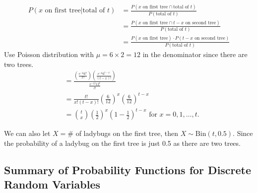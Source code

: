 \begin{example}
\begin{enumerate}[label=(\alph*)]
\begin{align*}
            P(\text{$x$ on first tree} | \text{total of $t$}) &= \frac{P(\text{$x$ on first tree} \cap \text{total of $t$})}{P(\text{total of $t$})} \\
            &= \frac{P(\text{$x$ on first tree} \cap \text{$t-x$ on second tree})}{P(\text{total of $t$})} \\
            &= \frac{P(\text{$x$ on first tree}) \cdot P(\text{$t-x$ on second tree})}{P(\text{total of $t$})}
        \end{align*}
        Use Poisson distribution with $\mu = 6 \times 2 = 12$ in the denominator since there are two trees.
        \begin{align*}
            &= \frac{ \left( \frac{e^{-6} 6^x}{x!} \right) \left( \frac{e^{-6} 6^{t-x}}{(t-x)!} \right) }{\frac{e^{-12} 12^t}{t!}} \\
            &= \frac{t!}{x!(t-x)!} \left( \frac{6}{12} \right)^x \left( \frac{6}{12} \right)^{t-x} \\
            &= \binom{t}{x} \left( \frac{1}{2} \right)^x \left( 1 - \frac{1}{2} \right)^{t-x} \text{ for $x = 0,1,\ldots, t$}. 
        \end{align*}
        \begin{remark}
            We can also let $X = \#$ of ladybugs on the first tree, then $X \sim \text{Bin}(t, 0.5)$. Since the probability of a ladybug on the first tree is just 0.5 as there are two trees.
        \end{remark}
    \end{enumerate}
\end{example}


\subsection{Summary of Probability Functions for Discrete Random Variables}


